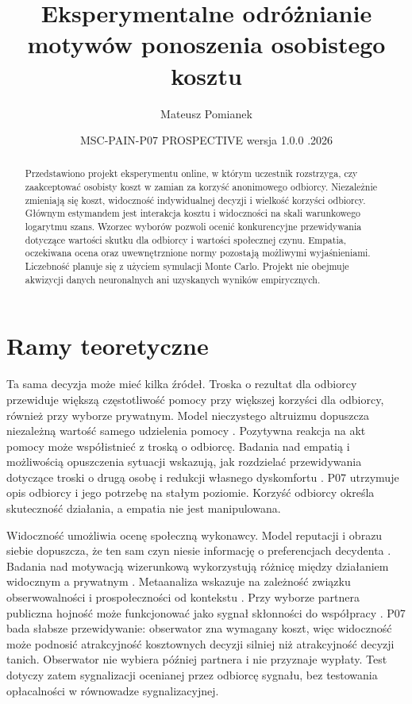 \documentclass[11pt,a4paper]{article}
\title{Eksperymentalne odróżnianie motywów ponoszenia osobistego kosztu}
\author{Mateusz Pomianek}
\date{MSC-PAIN-P07 \enspace PROSPECTIVE \enspace wersja 1.0.0 \enspace 26.11.2026}
\begin{document}
\maketitle
\begin{abstract}
Przedstawiono projekt eksperymentu online, w którym uczestnik rozstrzyga, czy zaakceptować osobisty koszt w zamian za korzyść anonimowego odbiorcy. Niezależnie zmieniają się koszt, widoczność indywidualnej decyzji i wielkość korzyści odbiorcy. Głównym estymandem jest interakcja kosztu i widoczności na skali warunkowego logarytmu szans. Wzorzec wyborów pozwoli ocenić konkurencyjne przewidywania dotyczące wartości skutku dla odbiorcy i wartości społecznej czynu. Empatia, oczekiwana ocena oraz uwewnętrznione normy pozostają możliwymi wyjaśnieniami. Liczebność planuje się z użyciem symulacji Monte Carlo. Projekt nie obejmuje akwizycji danych neuronalnych ani uzyskanych wyników empirycznych.
\end{abstract}

\section{Ramy teoretyczne}
Ta sama decyzja może mieć kilka źródeł. Troska o rezultat dla odbiorcy przewiduje większą częstotliwość pomocy przy większej korzyści dla odbiorcy, również przy wyborze prywatnym. Model nieczystego altruizmu dopuszcza niezależną wartość samego udzielenia pomocy \citep{andreoni1990}. Pozytywna reakcja na akt pomocy może współistnieć z troską o odbiorcę. Badania nad empatią i możliwością opuszczenia sytuacji wskazują, jak rozdzielać przewidywania dotyczące troski o drugą osobę i redukcji własnego dyskomfortu \citep{batson1981}. P07 utrzymuje opis odbiorcy i jego potrzebę na stałym poziomie. Korzyść odbiorcy określa skuteczność działania, a empatia nie jest manipulowana.

Widoczność umożliwia ocenę społeczną wykonawcy. Model reputacji i obrazu siebie dopuszcza, że ten sam czyn niesie informację o preferencjach decydenta \citep{benabou2006}. Badania nad motywacją wizerunkową wykorzystują różnicę między działaniem widocznym a prywatnym \citep{ariely2009}. Metaanaliza wskazuje na zależność związku obserwowalności i prospołeczności od kontekstu \citep{bradley2018}. Przy wyborze partnera publiczna hojność może funkcjonować jako sygnał skłonności do współpracy \citep{barclay2007}. P07 bada słabsze przewidywanie: obserwator zna wymagany koszt, więc widoczność może podnosić atrakcyjność kosztownych decyzji silniej niż atrakcyjność decyzji tanich. Obserwator nie wybiera później partnera i nie przyznaje wypłaty. Test dotyczy zatem sygnalizacji ocenianej przez odbiorcę sygnału, bez testowania opłacalności w równowadze sygnalizacyjnej.
\end{document}
